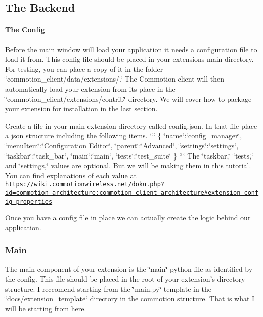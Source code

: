\subsection*{The Backend}

\paragraph*{The Config}

Before the main window will load your application it needs a configuration file to load it from. This config file should be placed in your extensions main directory. For testing, you can place a copy of it in the folder \char`\"{}commotion\-\_\-client/data/extensions/.\char`\"{} The Commotion client will then automatically load your extension from its place in the \char`\"{}commotion\-\_\-client/extensions/contrib\char`\"{} directory. We will cover how to package your extension for installation in the last section.

Create a file in your main extension directory called {\ttfamily config.\-json}. In that file place a json structure including the following items. ``` \{ \char`\"{}name\char`\"{}\-:\char`\"{}config\-\_\-manager\char`\"{}, \char`\"{}menu\-Item\char`\"{}\-:\char`\"{}\-Configuration Editor\char`\"{}, \char`\"{}parent\char`\"{}\-:\char`\"{}\-Advanced\char`\"{}, \char`\"{}settings\char`\"{}\-:\char`\"{}settings\char`\"{}, \char`\"{}taskbar\char`\"{}\-:\char`\"{}task\-\_\-bar\char`\"{}, \char`\"{}main\char`\"{}\-:\char`\"{}main\char`\"{}, \char`\"{}tests\char`\"{}\-:\char`\"{}test\-\_\-suite\char`\"{} \} ``` The \char`\"{}taskbar,\char`\"{} \char`\"{}tests,\char`\"{} and \char`\"{}settings,\char`\"{} values are optional. But we will be making them in this tutorial. You can find explanations of each value at \href{https://wiki.commotionwireless.net/doku.php?id=commotion_architecture:commotion_client_architecture#extension_config_properties}{\tt https\-://wiki.\-commotionwireless.\-net/doku.\-php?id=commotion\-\_\-architecture\-:commotion\-\_\-client\-\_\-architecture\#extension\-\_\-config\-\_\-properties}

Once you have a config file in place we can actually create the logic behind our application.

\subsubsection*{Main}

The main component of your extension is the \char`\"{}main\char`\"{} python file as identified by the config. This file should be placed in the root of your extension's directory structure. I reccomend starting from the \char`\"{}main.\-py\char`\"{} template in the \char`\"{}docs/extension\-\_\-template\char`\"{} directory in the commotion structure. That is what I will be starting from here.

